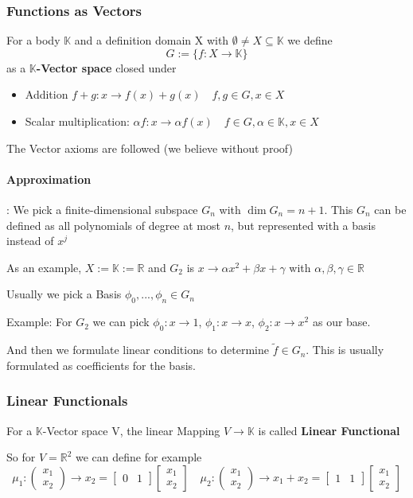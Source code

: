 \documentclass{article}
\begin{document}
\subsubsection{Functions as Vectors}
For a body $\mathbb{K}$ and a definition domain X with $\emptyset \neq X \subseteq \mathbb{K}$ we define
\[G := \{f:X \to \mathbb{K}\}\]
as a $\mathbb{K}$\textbf{-Vector space} closed under
\begin{itemize}
  \item Addition $f+g: x \to f(x) + g(x) \quad f,g\in G, x\in X$
  \item Scalar multiplication: $\alpha f: x\to \alpha f(x) \quad f\in G, \alpha\in\mathbb{K}, x\in X$
\end{itemize}

The Vector axioms are followed (we believe without proof)

\paragraph{Approximation}: We pick a finite-dimensional subspace $G_n$ with $\dim G_n = n+1$. This $G_n$ can be defined as all polynomials of degree at most $n$, but represented with a basis instead of $x^j$

As an example, $X := \mathbb{K} := \mathbb{R}$ and $G_2$ is $x\to \alpha x^2 + \beta x + \gamma$ with $\alpha,\beta,\gamma \in \mathbb{R}$

Usually we pick a Basis $\phi_0,...,\phi_n \in G_n$

Example: For $G_2$ we can pick $\phi_0 : x\to 1$, $\phi_1: x \to x$, $\phi_2: x\to x^2$ as our base.

And then we formulate linear conditions to determine $\tilde{f} \in G_n$. This is usually formulated as coefficients for the basis.

\subsubsection{Linear Functionals}
For a $\mathbb{K}$-Vector space V, the linear Mapping $V\to \mathbb{K}$ is called \textbf{Linear Functional}

So for $V = \mathbb{R}^2$ we can define for example
\[\mu_1 :\begin{pmatrix}
  x_1\\
  x_2
\end{pmatrix} \to x_2  = \begin{bmatrix}
  0 & 1
\end{bmatrix}\begin{bmatrix}
  x_1\\
  x_2
\end{bmatrix}\quad \mu_2: \begin{pmatrix}
  x_1 \\
  x_2
\end{pmatrix}\to x_1 + x_2 = \begin{bmatrix}
  1 & 1
\end{bmatrix}\begin{bmatrix}
  x_1\\
  x_2
\end{bmatrix}\]
\end{document}
